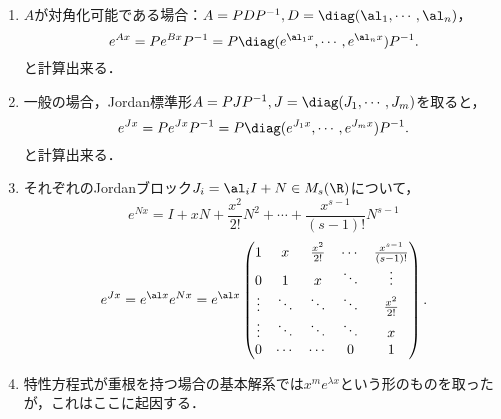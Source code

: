 \documentclass[uplatex,dvipdfmx]{jsarticle}
\begin{document}
\begin{observation}[標準形による行列値指数関数の計算]\mbox{}
    \begin{enumerate}
        \item $A$が対角化可能である場合：$A=PDP^{-1},D=\diag(\al_1,\cdots,\al_n)$，
        \[e^{Ax}=Pe^{Bx}P^{-1}=P\diag(e^{\al_1x},\cdots,e^{\al_nx})P^{-1}.\]
        と計算出来る．
        \item 一般の場合，Jordan標準形$A=PJP^{-1},J=\diag(J_1,\cdots,J_m)$を取ると，
        \[e^{Jx}=Pe^{Jx}P^{-1}=P\diag(e^{J_1x},\cdots,e^{J_mx})P^{-1}.\]
        と計算出来る．
        \item それぞれのJordanブロック$J_i=\al_iI+N\in M_s(\R)$について，
        \[e^{Nx}=I+xN+\frac{x^2}{2!}N^2+\cdots+\frac{x^{s-1}}{(s-1)!}N^{s-1}\]
        \[e^{Jx}=e^{\al x}e^{Nx}=e^{\al x} \begin{pmatrix}1&x&\frac{x^2}{2!}&\cdots&\frac{x^{s-1}}{(s-1)!}\\
        0&1&x&\ddots&\vdots\\
        \vdots&\ddots&\ddots&\ddots&\frac{x^2}{2!}\\
        \vdots&\ddots&\ddots&\ddots&x\\
        0&\cdots&\cdots&0&1
        \end{pmatrix}.\]
        \item 特性方程式が重根を持つ場合の基本解系では$x^{m}e^{\lambda x}$という形のものを取ったが，これはここに起因する．
    \end{enumerate}
\end{observation}
\end{document}
